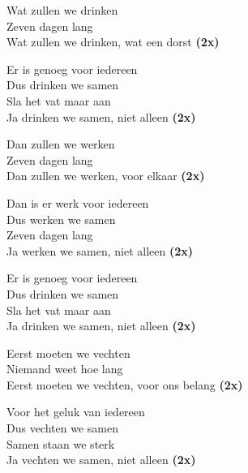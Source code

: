 Wat zullen we drinken \\
Zeven dagen lang \\
Wat zullen we drinken, wat een dorst \textbf{(2x)}

Er is genoeg voor iedereen \\
Dus drinken we samen \\
Sla het vat maar aan \\
Ja drinken we samen, niet alleen \textbf{(2x)}

Dan zullen we werken \\
Zeven dagen lang \\
Dan zullen we werken, voor elkaar \textbf{(2x)}

Dan is er werk voor iedereen \\
Dus werken we samen \\
Zeven dagen lang \\
Ja werken we samen, niet alleen \textbf{(2x)}

Er is genoeg voor iedereen \\
Dus drinken we samen \\
Sla het vat maar aan \\
Ja drinken we samen, niet alleen \textbf{(2x)}

Eerst moeten we vechten \\
Niemand weet hoe lang \\
Eerst moeten we vechten, voor ons belang \textbf{(2x)}

Voor het geluk van iedereen \\
Dus vechten we samen \\
Samen staan we sterk \\
Ja vechten we samen, niet alleen \textbf{(2x)}